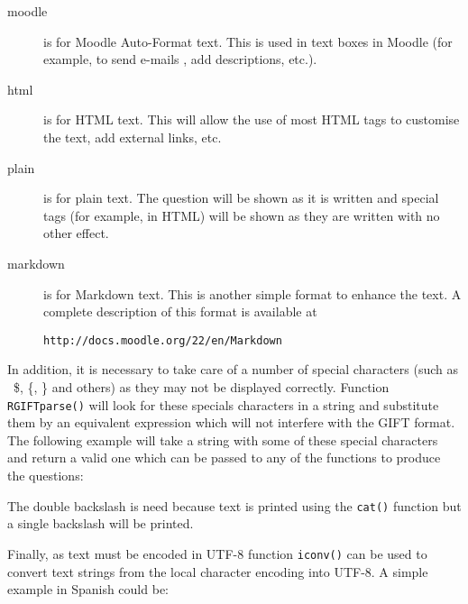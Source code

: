 \documentclass[a4paper]{article}
\newcommand{\code}[1]{\texttt{#1}}
\begin{document}
\begin{description}

\item[moodle] is for Moodle Auto-Format text. This is used in 
text boxes in Moodle (for example, to send e-mails , add descriptions, etc.).

\item[html] is for HTML text. This will allow the use of most HTML tags to
customise the text, add external links, etc.

\item[plain] is for plain text. The question will be shown as it is written
and special tags (for example, in HTML) will be shown as they are written with
no other effect.

\item[markdown] is for Markdown text. This is another simple format to enhance
the text. A complete description of this format is available at 

\verb+http://docs.moodle.org/22/en/Markdown+

\end{description}


In addition, it is necessary to take care of a number of special
characters (such as \, \$, \{, \} and others) as they may not be displayed
correctly. Function \code{RGIFTparse()}
will look for these specials characters in a string and substitute them
by an equivalent expression which will not interfere with the GIFT format.
The following example will take a string with some of these special
characters and return a valid one which can be passed to any of the
functions to produce the questions:

\begin{Schunk}
\end{Schunk}
\noindent
The double backslash is need because text is printed using the \code{cat()}
function but a single backslash will be printed.


Finally, as text must be encoded in UTF-8 function \code{iconv()} can be used
to convert  text strings from the local character encoding into UTF-8.
A simple example in Spanish could be:
\end{document}
